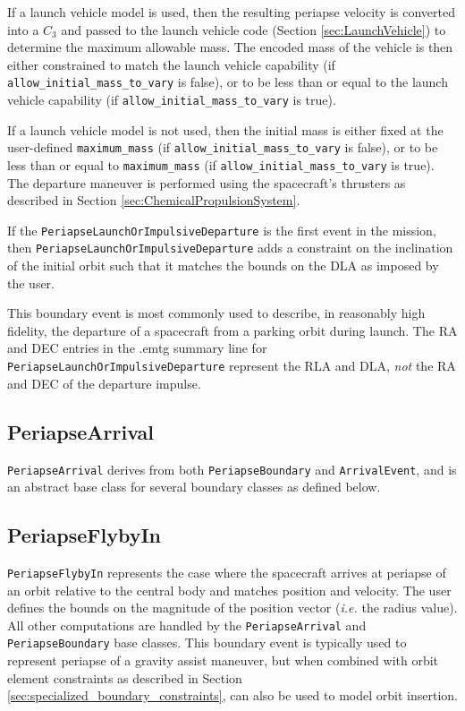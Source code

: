 If a launch vehicle model is used, then the resulting periapse velocity is converted into a $C_3$ and passed to the launch vehicle code (Section \ref{sec:LaunchVehicle}) to determine the maximum allowable mass. The encoded mass of the vehicle is then either constrained to match the launch vehicle capability (if \texttt{allow\_initial\_mass\_to\_vary} is false), or to be less than or equal to the launch vehicle capability (if \texttt{allow\_initial\_mass\_to\_vary} is true).

If a launch vehicle model is not used, then the initial mass is either fixed at the user-defined \texttt{maximum\_mass} (if \texttt{allow\_initial\_mass\_to\_vary} is false), or to be less than or equal to \texttt{maximum\_mass} (if \texttt{allow\_initial\_mass\_to\_vary} is true). The departure maneuver is performed using the spacecraft's thrusters as described in Section \ref{sec:ChemicalPropulsionSystem}.

If the \texttt{PeriapseLaunchOrImpulsiveDeparture} is the first event in the mission, then \texttt{PeriapseLaunchOrImpulsiveDeparture} adds a constraint on the inclination of the initial orbit such that it matches the bounds on the \ac{DLA} as imposed by the user.

This boundary event is most commonly used to describe, in reasonably high fidelity, the departure of a spacecraft from a parking orbit during launch. The \ac{RA} and \ac{DEC} entries in the .emtg summary line for \texttt{PeriapseLaunchOrImpulsiveDeparture} represent the \ac{RLA} and \ac{DLA}, \textit{not} the \ac{RA} and \ac{DEC} of the departure impulse.

\subsection{PeriapseArrival}
\label{subsec:PeriapseArrival}

\texttt{PeriapseArrival} derives from both \texttt{PeriapseBoundary} and \texttt{ArrivalEvent}, and is an abstract base class for several boundary classes as defined below.

\subsection{PeriapseFlybyIn}
\label{subsubsec:PeriapseFlybyIn}

\texttt{PeriapseFlybyIn} represents the case where the spacecraft arrives at periapse of an orbit relative to the central body and matches position and velocity. The user defines the bounds on the magnitude of the position vector (\textit{i.e.} the radius value). All other computations are handled by the \texttt{PeriapseArrival} and \texttt{PeriapseBoundary} base classes. This boundary event is typically used to represent periapse of a gravity assist maneuver, but when combined with orbit element constraints as described in Section \ref{sec:specialized_boundary_constraints}, can also be used to model orbit insertion.

